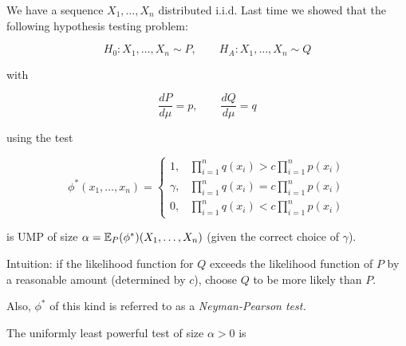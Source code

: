 \begin{theorem}

We have a sequence \(X_1, \ldots, X_n\) distributed i.i.d. Last time we showed that the following hypothesis testing problem:

\[
H_0: X_1, \ldots, X_n \sim P, \qquad H_A: X_1, \ldots, X_n \sim Q
\]

with

\[
\frac{dP}{d\mu} = p, \qquad \frac{dQ}{d\mu} = q
\]

using the test

\begin{equation}\label{mathstats.np.test.def}
\phi^* (x_1, \ldots, x_n) = \begin{cases}
1, &  \prod_{i=1}^n q(x_i) > c \prod_{i=1}^n p(x_i) \\
\gamma ,&   \prod_{i=1}^n q(x_i) =  c \prod_{i=1}^n p(x_i)  \\
0, &  \prod_{i=1}^n q(x_i) <  c \prod_{i=1}^n p(x_i) 
\end{cases}
\end{equation}

is UMP of size \(\alpha = \E_P(\phi^*)(X_1, \ldots, X_n)\) (given the correct choice of \(\gamma\)).

\end{theorem}

\begin{remark}

Intuition: if the likelihood function for \(Q\) exceeds the likelihood function of \(P\) by a reasonable amount (determined by \(c\)), choose \(Q\) to be more likely than \(P\).

Also, \(\phi^*\) of this kind is referred to as a \textit{Neyman-Pearson test.}

\end{remark}

\begin{proposition}

The uniformly least powerful test of size \(\alpha > 0\) is

\end{proposition}

